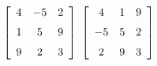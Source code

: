 {$\left[ \begin {array}{ccc} 4&-5&2\\\noalign{\medskip}1&5&9
\\\noalign{\medskip}9&2&3\end {array} \right] $}
{$\left[ \begin {array}{ccc} 4&1&9\\\noalign{\medskip}-5&5&2
\\\noalign{\medskip}2&9&3\end {array} \right] $}

